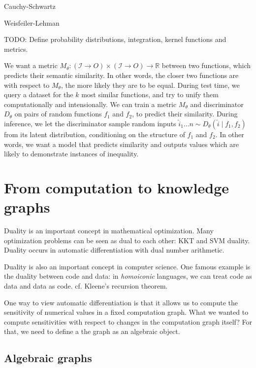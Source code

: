 \documentclass[11pt]{article}
\begin{document}
    Cauchy-Schwartz

    Weisfeiler-Lehman

    TODO: Define probability distributions, integration, kernel functions and metrics.

    We want a metric $M_\theta: (\mathcal{I}\rightarrow{O}) \times (\mathcal{I}\rightarrow{O})\rightarrow \mathbb{R}$ between two functions, which predicts their semantic similarity. In other words, the closer two functions are with respect to $M_\theta$, the more likely they are to be equal. During test time, we query a dataset for the $k$ most similar functions, and try to unify them computationally and intensionally. We can train a metric $M_\theta$ and discriminator $D_\theta$ on pairs of random functions $f_1$ and $f_2$, to predict their similarity. During inference, we let the discriminator sample random inputs $\hat i_1 \ldots n \sim D_\theta(\hat i \mid f_1, f_2)$ from its latent distribution, conditioning on the structure of $f_1$ and $f_2$. In other words, we want a model that predicts similarity and outputs values which are likely to demonstrate instances of inequality.

    \pagebreak


    \section{From computation to knowledge graphs}\label{sec:graphs}


    Duality is an important concept in mathematical optimization. Many optimization problems can be seen as dual to each other: KKT and SVM duality. Duality occurs in automatic differentiation with dual number arithmetic.

    Duality is also an important concept in computer science. One famous example is the duality between code and data: in \textit{homoiconic} languages, we can treat code as data and data as code. cf. Kleene's recursion theorem.

    One way to view automatic differentiation is that it allows us to compute the sensitivity of numerical values in a fixed computation graph. What we wanted to compute sensitivities with respect to changes in the computation graph itself? For that, we need to define a the graph as an algebraic object.

    \subsection{Algebraic graphs}\label{subsec:algebraic-graphs}
\end{document}
